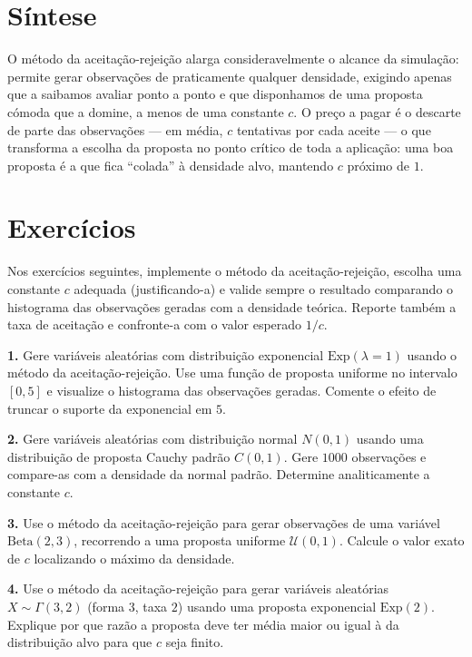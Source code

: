\documentclass[
  portuguese,
  11pt,
  openany]{book}
\begin{document}
\section{Síntese}\label{suxedntese}

O método da aceitação-rejeição alarga consideravelmente o alcance da simulação:
permite gerar observações de praticamente qualquer densidade, exigindo apenas
que a saibamos avaliar ponto a ponto e que disponhamos de uma proposta cómoda
que a domine, a menos de uma constante \(c\). O preço a pagar é o descarte de
parte das observações --- em média, \(c\) tentativas por cada aceite --- o que
transforma a escolha da proposta no ponto crítico de toda a aplicação: uma boa
proposta é a que fica ``colada'' à densidade alvo, mantendo \(c\) próximo de \(1\).

\section{Exercícios}\label{exercuxedcios-35}

Nos exercícios seguintes, implemente o método da aceitação-rejeição, escolha
uma constante \(c\) adequada (justificando-a) e valide sempre o resultado
comparando o histograma das observações geradas com a densidade teórica.
Reporte também a taxa de aceitação e confronte-a com o valor esperado \(1/c\).

\textbf{1.} Gere variáveis aleatórias com distribuição exponencial
\(\text{Exp}(\lambda = 1)\) usando o método da aceitação-rejeição. Use uma
função de proposta uniforme no intervalo \([0, 5]\) e visualize o histograma das
observações geradas. Comente o efeito de truncar o suporte da exponencial em
\(5\).

\textbf{2.} Gere variáveis aleatórias com distribuição normal \(N(0,1)\) usando uma
distribuição de proposta Cauchy padrão \(C(0,1)\). Gere \(1000\) observações e
compare-as com a densidade da normal padrão. Determine analiticamente a
constante \(c\).

\textbf{3.} Use o método da aceitação-rejeição para gerar observações de uma
variável \(\text{Beta}(2, 3)\), recorrendo a uma proposta uniforme
\(\mathcal{U}(0, 1)\). Calcule o valor exato de \(c\) localizando o máximo da
densidade.

\textbf{4.} Use o método da aceitação-rejeição para gerar variáveis aleatórias
\(X \sim \Gamma(3, 2)\) (forma \(3\), taxa \(2\)) usando uma proposta exponencial
\(\text{Exp}(2)\). Explique por que razão a proposta deve ter média maior ou igual
à da distribuição alvo para que \(c\) seja finito.
\end{document}
